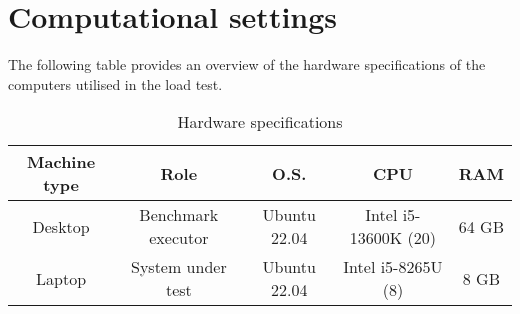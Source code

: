 \clearpage

\section{Computational settings}

The following table provides an overview of the hardware specifications of the computers utilised in the load test.

\begin{table}[H]
	\caption{Hardware specifications}
\begin{center}
	\begin{tabular}{ ccccc }
		\hline
		Machine type & Role & O.S. & CPU & RAM \\
		\hline
		Desktop & Benchmark executor & Ubuntu 22.04 & Intel i5-13600K (20) & 64 GB \\
		Laptop & System under test & Ubuntu 22.04 & Intel i5-8265U (8) & 8 GB \\
		\hline
	\end{tabular}
\end{center}
\end{table}
